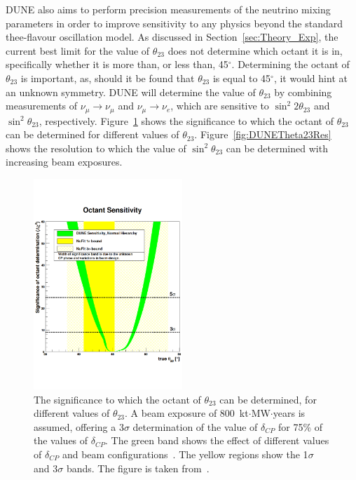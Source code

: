 DUNE also aims to perform precision measurements of the neutrino mixing parameters in order to improve sensitivity to any physics beyond the standard thee-flavour oscillation model. As discussed in Section~\ref{sec:Theory_Exp}, the current best limit for the value of $\theta_{23}$ does not determine which octant it is in, specifically whether it is more than, or less than, 45$^{\circ}$. Determining the octant of $\theta_{23}$ is important, as, should it be found that $\theta_{23}$ is equal to 45$^{\circ}$, it would hint at an unknown symmetry. DUNE will determine the value of $\theta_{23}$ by combining measurements of $\nu_{\mu} \rightarrow \nu_{\mu}$ and $\nu_{\mu} \rightarrow \nu_{e}$, which are sensitive to $\sin^{2}2\theta_{23}$ and $\sin^2\theta_{23}$, respectively. Figure~\ref{fig:DUNEOctantDetermination} shows the significance to which the octant of $\theta_{23}$ can be determined for different values of $\theta_{23}$. Figure~\ref{fig:DUNETheta23Res} shows the resolution to which the value of $\sin^{2}\theta_{23}$ can be determined with increasing beam exposures. \\

\begin{figure}
  \centering
  \includegraphics[width=0.5\textwidth]{DUNEOctantDetermination}
  \caption[The significance to which the octant of $\theta_{23}$ can be determined, for different values of $\theta_{23}$]
          {The significance to which the octant of $\theta_{23}$ can be determined, for different values of $\theta_{23}$. A beam exposure of 800~kt$\cdot$MW$\cdot$years is assumed, offering a 3$\sigma$ determination of the value of $\delta_{CP}$ for 75\% of the values of $\delta_{CP}$. The green band shows the effect of different values of $\delta_{CP}$ and beam configurations~\citep{DUNECDR_V3}. The yellow regions show the 1$\sigma$ and 3$\sigma$ bands. The figure is taken from~\citep{DUNECDR_V2}.}
  \label{fig:DUNEOctantDetermination}
\end{figure}

